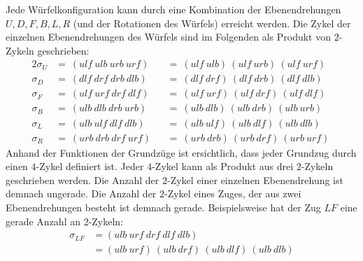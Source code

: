 \documentclass[12pt,a4paper, usenames, dvipsnames]{article}
\theoremstyle{mystyle}
\theoremstyle{definition}
\begin{document}
Jede Würfelkonfiguration kann durch eine Kombination der Ebenendrehungen $U, D, F, B, L, R$ (und der Rotationen des Würfels) erreicht werden. 
Die Zykel der einzelnen Ebenendrehungen des Würfels sind im Folgenden als Produkt von $2$-Zykeln geschrieben:
\begin{alignat*}{2}
\sigma_U &  = \ ( \textit{ulf} \ \textit{ulb} \ \textit{urb} \ \textit{urf} ) &&  = \ ( \textit{ulf} \ \textit{ulb} )   \ 
( \textit{ulf} \ \textit{urb} )  \ 
( \textit{ulf} \  \textit{urf} )\\

\sigma_D & = \ ( \textit{dlf} \ \textit{drf} \ \textit{drb} \ \textit{dlb} )  && = \ ( \textit{dlf} \ \textit{drf} )  \ 
( \textit{dlf} \ \textit{drb}  )  \ 
( \textit{dlf} \ \textit{dlb} )\\

\sigma_F & = \ ( \textit{ulf} \ \textit{urf} \ \textit{drf} \ \textit{dlf} )  && = \ ( \textit{ulf} \ \textit{urf} ) \ 
( \textit{ulf} \ \textit{drf} ) \ 
( \textit{ulf}  \ \textit{dlf} ) \\

\sigma_B & = \ ( \textit{ulb} \ \textit{dlb} \ \textit{drb} \ \textit{urb} )  && = \ ( \textit{ulb} \ \textit{dlb} ) \ 
( \textit{ulb} \  \textit{drb} ) \ 
( \textit{ulb}  \ \textit{urb} )\\

\sigma_L & = \ ( \textit{ulb} \ \textit{ulf} \ \textit{dlf} \ \textit{dlb} )  && = \ ( \textit{ulb} \ \textit{ulf} )  \ 
( \textit{ulb} \ \textit{dlf}  )  \ 
( \textit{ulb} \ \textit{dlb} ) \\

\sigma_R & = \ ( \textit{urb} \ \textit{drb} \ \textit{drf} \ \textit{urf} ) && = \  ( \textit{urb} \ \textit{drb}  )  \ 
( \textit{urb} \  \textit{drf} )  \ 
( \textit{urb} \ \textit{urf} )  \
\end{alignat*}
Anhand der Funktionen der Grundzüge ist ersichtlich, dass jeder Grundzug durch einen $4$-Zykel definiert ist.
Jeder $4$-Zykel kann als Produkt aus drei $2$-Zykeln geschrieben werden. 
Die Anzahl der $2$-Zykel einer einzelnen Ebenendrehung ist demnach ungerade. Die Anzahl der $2$-Zykel eines Zuges, der aus zwei Ebenendrehungen besteht ist demnach gerade.
Beispielsweise hat der Zug $LF$ eine gerade Anzahl an $2$-Zykeln:
\begin{align*}
\sigma_{LF} & = (\textit{ulb} \ \textit{urf} \ \textit{drf} \ \textit{dlf} \ \textit{dlb}) \\
 & =  (\textit{ulb} \ \textit{urf}) \ (\textit{ulb} \ \textit{drf}) \ (\textit{ulb} \ \textit{dlf}) \ (\textit{ulb} \ \textit{dlb})
\end{align*}
\end{document}
